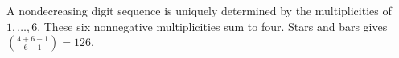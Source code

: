 A nondecreasing digit sequence is uniquely determined by the multiplicities of $1,\ldots,6$. These six nonnegative multiplicities sum to four. Stars and bars gives $\binom{4+6-1}{6-1}=\boxed{126}$.

